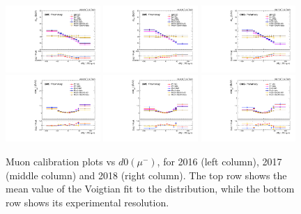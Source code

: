 \begin{figure}[!htb]
      \centering
      \captionsetup{justification=justified}
      \includegraphics[width=0.32\textwidth]{pics/muon_corr/muon_cal/2016/muN_d0_rebin_summary_mean.pdf}
      \includegraphics[width=0.32\textwidth]{pics/muon_corr/muon_cal/2017/muN_d0_rebin_summary_mean.pdf}
      \includegraphics[width=0.32\textwidth]{pics/muon_corr/muon_cal/2018/muN_d0_rebin_summary_mean.pdf}
      \includegraphics[width=0.32\textwidth]{pics/muon_corr/muon_cal/2016/muN_d0_rebin_summary_reso.pdf}
      \includegraphics[width=0.32\textwidth]{pics/muon_corr/muon_cal/2017/muN_d0_rebin_summary_reso.pdf}
      \includegraphics[width=0.32\textwidth]{pics/muon_corr/muon_cal/2018/muN_d0_rebin_summary_reso.pdf}
      \caption{Muon calibration plots vs $d0(\mu^{-})$, for 2016 (left column), 2017 (middle column) and 2018 (right column).
               The top row shows the mean value of the Voigtian fit to the \mmm distribution, 
               while the bottom row shows its experimental resolution.}
      \label{fig:mucal_muN_d0}
\end{figure}